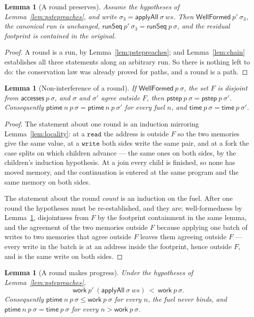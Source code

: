 \documentclass[11pt,a4paper]{article}
\theoremstyle{definition}
\theoremstyle{plain}
\newtheorem{lemma}[definition]{Lemma}
\theoremstyle{remark}
\newcommand{\st}{\sigma}
\newcommand{\acc}{\mathsf{accesses}}
\newcommand{\runSeq}{\mathsf{runSeq}}
\newcommand{\wf}{\mathsf{WellFormed}}
\newcommand{\work}{\mathsf{work}}
\newcommand{\spn}{\mathsf{time}}
\newcommand{\pstep}{\mathsf{pstep}}
\begin{document}
\begin{lemma}[A round preserves]\label{lem:pstepcombined}
Assume the hypotheses of Lemma~\ref{lem:pstepreaches}, and write
$\st_3 = \mathsf{applyAll}\ \st\ ws$. Then $\wf\ p'\ \st_3$, the canonical run is unchanged,
$\runSeq\ p'\ \st_3 = \runSeq\ p\ \st$, and the residual footprint is contained in the
original.
\end{lemma}

\begin{proof}
A round is a run, by Lemma~\ref{lem:pstepreaches}; and Lemma~\ref{lem:chain} establishes all
three statements along an arbitrary run. So there is nothing left to do: the conservation law
was already proved for paths, and a round is a path.
\end{proof}

\begin{lemma}[Non-interference of a round]\label{lem:pstepnonint}
If $\wf\ p\ \st$, the set $F$ is disjoint from $\acc\ p\ \st$, and $\st$ and $\st'$ agree
outside $F$, then $\pstep\ p\ \st = \pstep\ p\ \st'$. Consequently
$\mathsf{ptime}\ n\ p\ \st = \mathsf{ptime}\ n\ p\ \st'$ for every fuel $n$, and
$\spn\ p\ \st = \spn\ p\ \st'$.
\end{lemma}

\begin{proof}
The statement about one round is an induction mirroring Lemma~\ref{lem:locality}: at a
$\texttt{read}$ the address is outside $F$ so the two memories give the same value, at a
$\texttt{write}$ both sides write the same pair, and at a fork the case splits on which
children advance --- the same ones on both sides, by the children's induction hypothesis. At a
join every child is finished, so none has moved memory, and the continuation is entered at the
same program and the same memory on both sides.

The statement about the round \emph{count} is an induction on the fuel. After one round the
hypotheses must be re-established, and they are: well-formedness by
Lemma~\ref{lem:pstepcombined}, disjointness from $F$ by the footprint containment in the same
lemma, and the agreement of the two memories outside $F$ because applying one batch of writes
to two memories that agree outside $F$ leaves them agreeing outside $F$ --- every write in the
batch is at an address inside the footprint, hence outside $F$, and is the same write on both
sides.
\end{proof}

\begin{lemma}[A round makes progress]\label{lem:progress}
Under the hypotheses of Lemma~\ref{lem:pstepreaches},
\[
  \work\ p'\ (\mathsf{applyAll}\ \st\ ws) \ <\ \work\ p\ \st .
\]
Consequently $\mathsf{ptime}\ n\ p\ \st \le \work\ p\ \st$ for every $n$, the fuel never
binds, and $\mathsf{ptime}\ n\ p\ \st = \spn\ p\ \st$ for every $n > \work\ p\ \st$.
\end{lemma}
\end{document}
